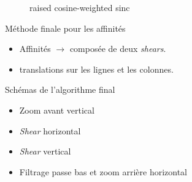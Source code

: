\documentclass[c,12pt]{beamer}
\newcommand{\ra}[0]{\rightarrow}
\begin{document}
\begin{frame}
\begin{figure}
\centering
{}
\caption{raised cosine-weighted sinc}
\end{figure}
\end{frame}


\begin{frame}{Méthode finale pour les affinités}
\begin{itemize}
\item Affinités $\ra$ composée de deux \emph{shears}.
\item translations sur les lignes et les colonnes.
\end{itemize}

\begin{block}{Schémas de l'algorithme final}

\begin{itemize}
\item Zoom avant vertical
\item \emph{Shear} horizontal
\item \emph{Shear} vertical
\item Filtrage passe bas et zoom arrière horizontal
\end{itemize}

\end{block}

\end{frame}
    
\end{document}
